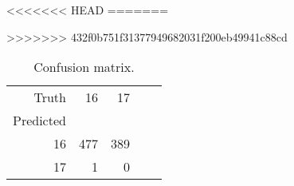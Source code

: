 \begin{table}[h]
\centering
<<<<<<< HEAD
=======
\caption{Confusion matrix.}
>>>>>>> 432f0b751f31377949682031f200eb49941c88cd
\label{table:5}
\begin{tabular}{rrrrr}
\toprule
Truth & 16 & 17 \\
Predicted &  &  \\
\midrule
16 & 477 & 389 \\
17 & 1 & 0 \\
\bottomrule
\end{tabular}
\end{table}
